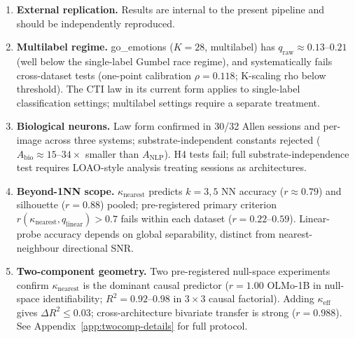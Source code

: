 \documentclass{article}
\begin{document}
\begin{enumerate}
\item \textbf{External replication.} Results are internal to the present pipeline and should be independently reproduced.
\item \textbf{Multilabel regime.} go\_emotions ($K=28$, multilabel) has $q_\mathrm{raw}\approx0.13$--$0.21$ (well below the single-label Gumbel race regime), and systematically fails cross-dataset tests (one-point calibration $\rho=0.118$; K-scaling rho below threshold). The CTI law in its current form applies to single-label classification settings; multilabel settings require a separate treatment.
\item \textbf{Biological neurons.} Law form confirmed in 30/32 Allen sessions and per-image across three systems; substrate-independent constants rejected ($A_\mathrm{bio}\approx15$--$34\times$ smaller than $A_\mathrm{NLP}$). H4 tests fail; full substrate-independence test requires LOAO-style analysis treating sessions as architectures.
\item \textbf{Beyond-1NN scope.} $\kappa_\mathrm{nearest}$ predicts $k=3,5$ NN accuracy ($r\approx0.79$) and silhouette ($r=0.88$) pooled; pre-registered primary criterion $r(\kappa_\mathrm{nearest}, q_\mathrm{linear})>0.7$ fails within each dataset ($r=0.22$--$0.59$). Linear-probe accuracy depends on global separability, distinct from nearest-neighbour directional SNR.
\item \textbf{Two-component geometry.} Two pre-registered null-space experiments confirm $\kappa_{\mathrm{nearest}}$ is the dominant causal predictor ($r=1.00$ OLMo-1B in null-space identifiability; $R^2=0.92$--$0.98$ in $3\times3$ causal factorial). Adding $\kappa_{\mathrm{eff}}$ gives $\Delta R^2\leq0.03$; cross-architecture bivariate transfer is strong ($r=0.988$). See Appendix~\ref{app:twocomp-details} for full protocol.
\end{enumerate}
\end{document}
